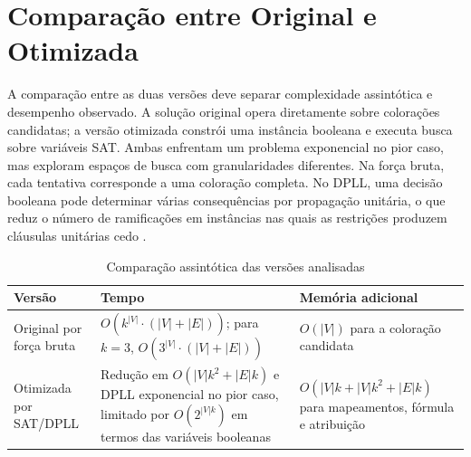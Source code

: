\section{Comparação entre Original e Otimizada}\label{sec:secao_ComparacaoOriginalOtimizado}

A comparação entre as duas versões deve separar complexidade assintótica e desempenho observado. A solução original opera diretamente sobre colorações candidatas; a versão otimizada constrói uma instância booleana e executa busca sobre variáveis SAT. Ambas enfrentam um problema exponencial no pior caso, mas exploram espaços de busca com granularidades diferentes. Na força bruta, cada tentativa corresponde a uma coloração completa. No DPLL, uma decisão booleana pode determinar várias consequências por propagação unitária, o que reduz o número de ramificações em instâncias nas quais as restrições produzem cláusulas unitárias cedo \parencite{dalton-reisUDESC_PAA_TFMainipynb}.

\begin{table}[htbp]
\centering
\caption{Comparação assintótica das versões analisadas}
\label{tab:complexidades}
\small
\begin{tabular}{>{\raggedright\arraybackslash}p{}>{\raggedright\arraybackslash}p{}>{\raggedright\arraybackslash}p{}}
\hline
\textbf{Versão} & \textbf{Tempo} & \textbf{Memória adicional} \\
\hline
Original por força bruta & $O(k^{|V|}\cdot(|V|+|E|))$; para $k=3$, $O(3^{|V|}\cdot(|V|+|E|))$ & $O(|V|)$ para a coloração candidata \\
\hline
Otimizada por SAT/DPLL & Redução em $O(|V|k^2+|E|k)$ e DPLL exponencial no pior caso, limitado por $O(2^{|V|k})$ em termos das variáveis booleanas & $O(|V|k+|V|k^2+|E|k)$ para mapeamentos, fórmula e atribuição \\
\hline
\end{tabular}
\end{table}

